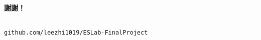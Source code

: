 \documentclass[aspectratio=169, 12pt]{beamer}
\begin{document}
{
\begin{frame}
\vfill
\begin{center}
{\fontsize{32}{36}\selectfont\bfseries 謝謝！}\par\vspace{0.6em}
{\color{taikored}\rule{2.2cm}{2pt}}\par\vspace{0.8em}
{\color{quiet}\texttt{github.com/leezhi1019/ESLab-FinalProject}}
\end{center}
\vfill
\end{frame}}
\end{document}
